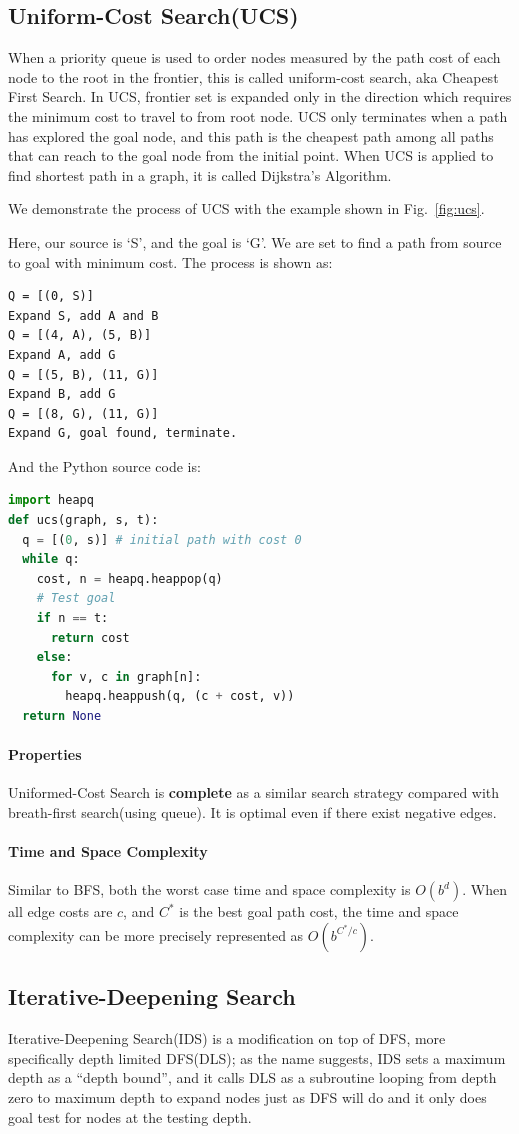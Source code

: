 \documentclass[../main.tex]{subfiles}
\begin{document}
\subsection{Uniform-Cost Search(UCS)}
When a priority queue is used to order nodes measured by the path cost of each node to the root  in the frontier, this is called uniform-cost search, aka  Cheapest First Search. In UCS, frontier set is expanded only in the direction which requires the minimum cost to travel to from root node. UCS only terminates when a path has explored the goal node, and this path is the cheapest path among all paths that can reach to the goal node from the initial point.  When UCS is applied to find shortest path in a graph, it is called Dijkstra's Algorithm. 

We demonstrate the process of UCS with the example shown in Fig.~\ref{fig:ucs}.

Here, our source is `S', and the goal is `G'. We are set to find a path from source to goal with minimum cost. The process is shown as:
\begin{lstlisting}[numbers=none]
Q = [(0, S)]
Expand S, add A and B
Q = [(4, A), (5, B)]
Expand A, add G
Q = [(5, B), (11, G)]
Expand B, add G
Q = [(8, G), (11, G)]
Expand G, goal found, terminate.
\end{lstlisting}
And the Python source code is:
\begin{lstlisting}[language=Python]
import heapq
def ucs(graph, s, t):
  q = [(0, s)] # initial path with cost 0
  while q:
    cost, n = heapq.heappop(q)
    # Test goal
    if n == t:
      return cost
    else:
      for v, c in graph[n]:
        heapq.heappush(q, (c + cost, v))
  return None
\end{lstlisting}
\paragraph{Properties} Uniformed-Cost Search is \textbf{complete} as a similar search strategy compared with breath-first search(using queue). It is optimal even if there exist negative edges. 

\paragraph{Time and Space Complexity}  Similar to BFS, both the worst case time and space complexity is $O(b^d)$. When all edge costs are $c$, and $C^{*}$ is the best goal path cost, the time and space complexity can be more precisely represented as $O(b^{C^{*}/c})$.
\subsection{Iterative-Deepening Search}
Iterative-Deepening Search(IDS) is a modification on top of DFS, more specifically depth limited DFS(DLS); as the name suggests, IDS sets a maximum depth as a ``depth bound'', and it calls DLS as a subroutine looping from depth zero to maximum depth to expand nodes just as DFS will do and it only does goal test for nodes at the testing depth.
\end{document}

